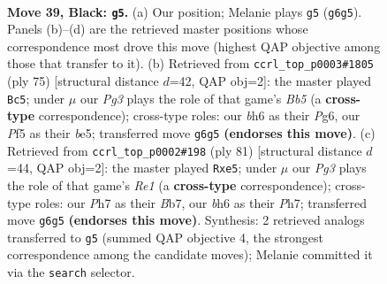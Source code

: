 \documentclass[11pt]{article}
\begin{document}
\clearpage

\begin{figure}[p]\centering
\begin{subfigure}{0.46\textwidth}\centering
\resizebox{\linewidth}{!}{%
\newchessgame
\chessboard[
  setfen={7k/6Rp/3N2pB/5p2/5P1P/3P4/P1P2PK1/8 b - - 1 39},
  showmover=false,
  pgfstyle=straightmove, color=movearrow, markmove={g6-g5}
]}
\caption{}
\end{subfigure}\hfill
\begin{subfigure}{0.46\textwidth}\centering
\resizebox{\linewidth}{!}{%
\newchessgame
\chessboard[
  setfen={8/3k1p1p/R5p1/p3B3/1b2PP2/5K2/2r2P1P/8 b - - 4 38},
  showmover=false,
  pgfstyle=straightmove, color=movearrow, markmove={b4-c5}
]}
\caption{}
\end{subfigure}
\\[4pt]
\begin{subfigure}{0.46\textwidth}\centering
\resizebox{\linewidth}{!}{%
\newchessgame
\chessboard[
  setfen={4r3/kb5p/p5p1/4Pp2/1R6/3BP1P1/1P1K3P/8 b - - 0 41},
  showmover=false,
  pgfstyle=straightmove, color=movearrow, markmove={e8-e5}
]}
\caption{}
\end{subfigure}\hfill

\caption{\textbf{Move 39, Black: \texttt{g5}.} (a) Our position; Melanie plays \texttt{g5} (\texttt{g6g5}). Panels (b)--(d) are the retrieved master positions whose correspondence most drove this move (highest QAP objective among those that transfer to it). (b) Retrieved from \texttt{ccrl\_top\_p0003\#1805} (ply 75) [structural distance $d$=42, QAP obj=2]: the master played \texttt{Bc5}; under $\mu$ our \emph{Pg3} plays the role of that game's \emph{Bb5} (a \textbf{cross-type} correspondence); cross-type roles: our \emph{b}h6 as their \emph{P}g6, our \emph{P}f5 as their \emph{b}e5; transferred move \texttt{g6g5} \textbf{(endorses this move)}. (c) Retrieved from \texttt{ccrl\_top\_p0002\#198} (ply 81) [structural distance $d$=44, QAP obj=2]: the master played \texttt{Rxe5}; under $\mu$ our \emph{Pg3} plays the role of that game's \emph{Re1} (a \textbf{cross-type} correspondence); cross-type roles: our \emph{P}h7 as their \emph{B}b7, our \emph{b}h6 as their \emph{P}h7; transferred move \texttt{g6g5} \textbf{(endorses this move)}. Synthesis: 2 retrieved analogs transferred to \texttt{g5} (summed QAP objective 4, the strongest correspondence among the candidate moves); Melanie committed it via the \texttt{search} selector.}
\label{fig:thought-m77}
\end{figure}
\end{document}
